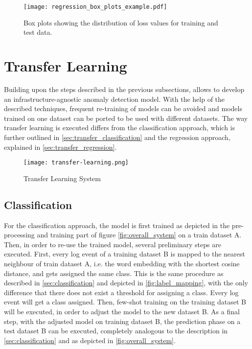 \begin{figure}[htb]
  \centering
  \texttt{[image: regression\_box\_plots\_example.pdf]} \\
  \caption{Box plots showing the distribution of loss values for training and test data.}
  \label{fig:regression_with_threshold}
\end{figure}


\section{Transfer Learning \label{sec:transferlearning}}
Building upon the steps described in the previous subsections, allows to develop an infrastructure-agnostic anomaly detection model. With the help of the described techniques, frequent re-training of models can be avoided and models trained on one dataset can be ported to be used with different datasets. The way transfer learning is executed differs from the classification approach, which is further outlined in \ref{sec:transfer_classification} and the regression approach, explained in \ref{sec:transfer_regression}. 

\begin{figure}[H]
	\centering
	\texttt{[image: transfer-learning.png]}
	\caption{Transfer Learning System}
	\label{fig:transfer_learning_system}
\end{figure}

\subsection{Classification \label{sec:transfer_classification}}
For the classification approach, the model is first trained as depicted in the pre-processing and training part of figure \ref{fig:overall_system} on a train dataset A. Then, in order to re-use the trained model, several preliminary steps are executed. First, every log event of a training dataset B is mapped to the nearest neighbour of train dataset A, i.e. the word embedding with the shortest cosine distance, and gets assigned the same class. This is the same procedure as described in \ref{sec:classification} and depicted in \ref{fig:label_mapping}, with the only difference that there does not exist a threshold for assigning a class. Every log event will get a class assigned. Then, few-shot training on the training dataset B will be executed, in order to adjust the model to the new dataset B. As a final step, with the adjusted model on training dataset B, the prediction phase on a test dataset B can be executed, completely analogous to the description in \ref{sec:classification} and as depicted in \ref{fig:overall_system}.

